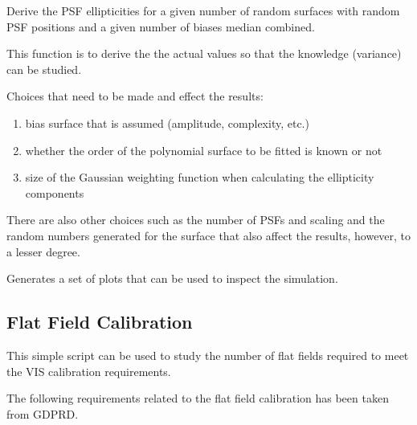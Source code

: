 \documentclass[a4paper,12pt,english]{sphinxmanual}
\begin{document}
\begin{fulllineitems}
\label{reduction:analysis.biasCalibration.testBiasCalibrationSigma}
Derive the PSF ellipticities for a given number of random surfaces with random PSF positions
and a given number of biases median combined.

This function is to derive the the actual values so that the knowledge (variance) can be studied.

Choices that need to be made and effect the results:
\begin{enumerate}
\item {} 
bias surface that is assumed (amplitude, complexity, etc.)

\item {} 
whether the order of the polynomial surface to be fitted is known or not

\item {} 
size of the Gaussian weighting function when calculating the ellipticity components

\end{enumerate}

There are also other choices such as the number of PSFs and scaling and the random numbers generated for
the surface that also affect the results, however, to a lesser degree.

Generates a set of plots that can be used to inspect the simulation.

\end{fulllineitems}

\label{reduction:module-analysis.FlatfieldCalibration}

\subsection{Flat Field Calibration}
\label{reduction:flat-field-calibration}
This simple script can be used to study the number of flat fields required to meet the VIS calibration requirements.

The following requirements related to the flat field calibration has been taken from GDPRD.
\end{document}
